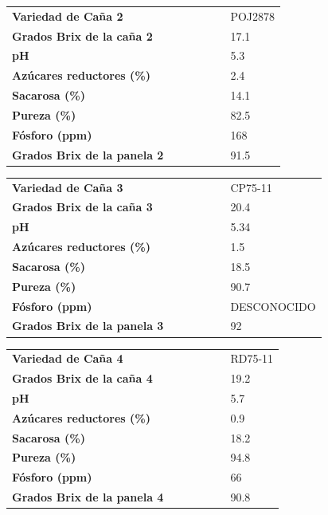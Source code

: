 \documentclass{article}%
\begin{document}
\linebreak%
\newline%
%
\linebreak%
\begin{tabular}{lcccccl}%
\textbf{Variedad de Caña 2}& & & & & &POJ2878\\%
\textbf{Grados Brix de la caña 2}& & & & & &17.1\\%
\textbf{pH}& & & & & &5.3\\%
\textbf{Azúcares reductores (\%)}& & & & & &2.4\\%
\textbf{Sacarosa (\%)}& & & & & &14.1\\%
\textbf{Pureza (\%)}& & & & & &82.5\\%
\textbf{Fósforo (ppm)}& & & & & &168\\%
\textbf{Grados Brix de la panela 2}& & & & & &91.5\\%
\end{tabular}%
\linebreak%
\newline%
%
\linebreak%
\begin{tabular}{lcccccl}%
\textbf{Variedad de Caña 3}& & & & & &CP75{-}11\\%
\textbf{Grados Brix de la caña 3}& & & & & &20.4\\%
\textbf{pH}& & & & & &5.34\\%
\textbf{Azúcares reductores (\%)}& & & & & &1.5\\%
\textbf{Sacarosa (\%)}& & & & & &18.5\\%
\textbf{Pureza (\%)}& & & & & &90.7\\%
\textbf{Fósforo (ppm)}& & & & & &DESCONOCIDO\\%
\textbf{Grados Brix de la panela 3}& & & & & &92\\%
\end{tabular}%
\linebreak%
\newline%
%
\linebreak%
\begin{tabular}{lcccccl}%
\textbf{Variedad de Caña 4}& & & & & &RD75{-}11\\%
\textbf{Grados Brix de la caña 4}& & & & & &19.2\\%
\textbf{pH}& & & & & &5.7\\%
\textbf{Azúcares reductores (\%)}& & & & & &0.9\\%
\textbf{Sacarosa (\%)}& & & & & &18.2\\%
\textbf{Pureza (\%)}& & & & & &94.8\\%
\textbf{Fósforo (ppm)}& & & & & &66\\%
\textbf{Grados Brix de la panela 4}& & & & & &90.8\\%
\end{tabular}%
\linebreak%
\newline%
%
\linebreak%
\end{document}
